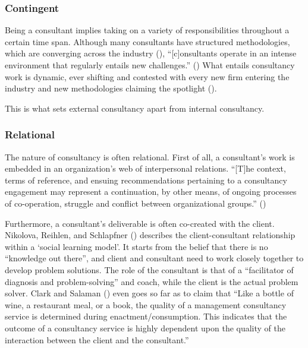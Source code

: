 \documentclass[
  man,floatsintext]{apa6}
\begin{document}
\subsubsection{Contingent}\label{contingent}

Being a consultant implies taking on a variety of responsibilities throughout a certain time span. Although many consultants have structured methodologies, which are converging across the industry (), ``{[}c{]}onsultants operate in an intense environment that regularly entails new challenges.'' () What entails consultancy work is dynamic, ever shifting and contested with every new firm entering the industry and new methodologies claiming the spotlight ().

This is what sets external consultancy apart from internal consultancy.

\subsubsection{Relational}\label{relational}

The nature of consultancy is often relational. First of all, a consultant's work is embedded in an organization's web of interpersonal relations. ``{[}T{]}he context, terms of reference, and ensuing recommendations pertaining to a consultancy engagement may represent a continuation, by other means, of ongoing processes of co-operation, struggle and conflict between organizational groups.'' ()

Furthermore, a consultant's deliverable is often co-created with the client. Nikolova, Reihlen, and Schlapfner () describes the client-consultant relationship within a `social learning model'. It starts from the belief that there is no ``knowledge out there'', and client and consultant need to work closely together to develop problem solutions. The role of the consultant is that of a ``facilitator of diagnosis and problem-solving'' and coach, while the client is the actual problem solver. Clark and Salaman () even goes so far as to claim that ``Like a bottle of wine, a restaurant meal, or a book, the quality of a management consultancy service is determined during enactment/consumption. This indicates that the outcome of a consultancy service is highly dependent upon the quality of the interaction between the client and the consultant.''
\end{document}
